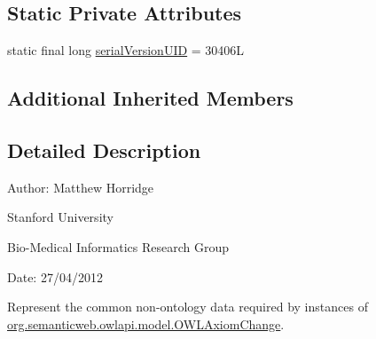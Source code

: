 \subsection*{Static Private Attributes}
\begin{DoxyCompactItemize}
\item 
static final long \hyperlink{classorg_1_1semanticweb_1_1owlapi_1_1change_1_1_axiom_change_data_a377e8e574dfe56215f84b708b0024e2d}{serial\-Version\-U\-I\-D} = 30406\-L
\end{DoxyCompactItemize}
\subsection*{Additional Inherited Members}


\subsection{Detailed Description}
Author\-: Matthew Horridge\par
 Stanford University\par
 Bio-\/\-Medical Informatics Research Group\par
 Date\-: 27/04/2012 

Represent the common non-\/ontology data required by instances of \hyperlink{classorg_1_1semanticweb_1_1owlapi_1_1model_1_1_o_w_l_axiom_change}{org.\-semanticweb.\-owlapi.\-model.\-O\-W\-L\-Axiom\-Change}. 

